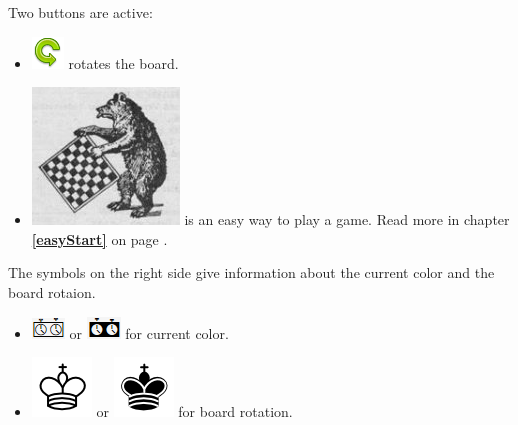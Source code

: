 \documentclass[11pt,a4paper]{article}
\begin{document}
	Two buttons are active:
	\begin{itemize}
		\item \includegraphics[scale=0.5]{arrow_rotate_anticlockwise.png} rotates the board.
		\item \includegraphics[scale=0.2]{bearchess_2.png} is an easy way to play a game.
		Read more in chapter \textbf{\ref{easyStart}  } on page \pageref{easyStart}.
	\end{itemize}
	The symbols on the right side give information about the current color and the board rotaion.
	\begin{itemize}
		\item \includegraphics[scale=0.6]{WhiteClock.png} or \includegraphics[scale=0.6]{BlackClock.png} for current color.
		\item \includegraphics[scale=0.3]{KingW.png}  or \includegraphics[scale=0.3]{KingB.png} for board rotation. 
	\end{itemize}
	
	
\end{document}
